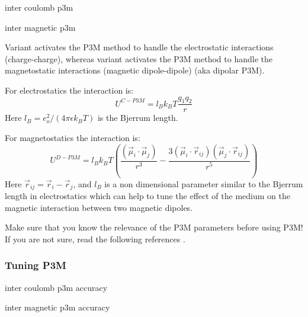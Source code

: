 \begin{essyntax}
  inter coulomb  p3m 
     

  inter magnetic  p3m 
     
  \begin{features}
  \end{features}
\end{essyntax}

Variant  activates the P3M method to handle the
electrostatic interactions (charge-charge), whereas variant
 activates the P3M method to handle the magnetostatic
interactions (magnetic dipole-dipole) (aka dipolar P3M).

For electrostatics the interaction is:
\begin{equation}
  U^{C-P3M} = l_B k_B T \frac{q_1 q_2}{r}
\end{equation}
Here $l_B = e_o^2 / (4 \pi \epsilon k_B T)$ is the Bjerrum length.

For magnetostatics the interaction is:
\begin{equation}
  U^{D-P3M} = l_{B} k_B T \left( \frac{(\vec{\mu}_i \cdot \vec{\mu}_j)}{r^3} 
  - \frac{3  (\vec{\mu}_i \cdot \vec{r}_{ij})  (\vec{\mu}_j \cdot \vec{r}_{ij}) }{r^5} \right)
\end{equation}
Here $\vec{r}_{ij}=\vec{r}_{i}-\vec{r}_{j}$, and $l_{B}$ is a non
dimensional parameter similar to the Bjerrum length in electrostatics
which can help to tune the effect of the medium on the magnetic
interaction between two magnetic dipoles.

Make sure that you know the relevance of the P3M parameters before
using P3M! If you are not sure, read the following references
\cite{ewald21, hockney88, kolafa92, deserno98, deserno98a, deserno00,
  deserno00a, cerda08a}.

\subsubsection{Tuning P3M}
\begin{essyntax}
  inter coulomb  p3m 
  accuracy \\

  inter magnetic  p3m 
  accuracy \\
  \begin{features}
  \end{features}
\end{essyntax}

